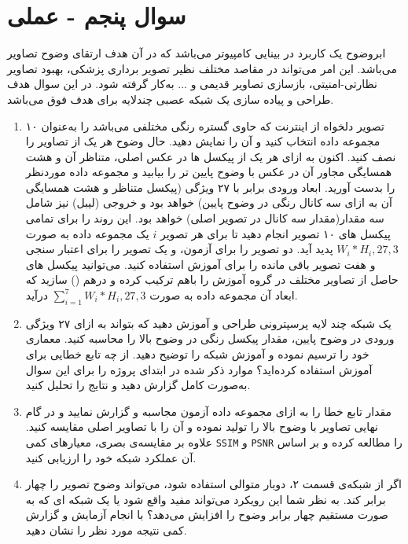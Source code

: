 \section{سوال پنجم - عملی}
ابروضوح یک کاربرد در بینایی کامپیوتر می‌باشد که در آن هدف ارتقای وضوح تصاویر می‌باشد. این امر می‌تواند در مقاصد مختلف نظیر تصویر برداری پزشکی، بهبود تصاویر نظارتی-امنیتی، بازسازی تصاویر قدیمی و ... به‌کار گرفته شود. در این سوال هدف طراحی و پیاده سازی یک شبکه عصبی چند‌لایه برای هدف فوق می‌باشد.



\begin{enumerate}
	\item ۱۰ تصویر دلخواه از اینترنت که حاوی گستره رنگی مختلفی می‌باشد را به‌عنوان مجموعه داده انتخاب کنید و آن را نمایش دهید. حال وضوح هر یک از تصاویر را نصف کنید. اکنون به ازای هر یک از پیکسل ها در عکس اصلی، متناظر آن و هشت همسایگی مجاور آن در عکس با وضوح پایین تر را بیابید و مجموعه داده موردنظر را بدست آورید. ابعاد ورودی برابر با ۲۷ ویژگی (پیکسل متناظر و هشت همسایگی آن به ازای سه کانال رنگی در وضوح پایین) خواهد بود و خروجی (لیبل) نیز شامل سه مقدار(مقدار سه کانال  در تصویر اصلی) خواهد بود. 	این روند را برای تمامی پیکسل های ۱۰ تصویر انجام دهید تا برای هر تصویر $i$ یک مجموعه داده به صورت 
	$W_i*H_i, 27, 3$ پدید آید. دو تصویر را برای آزمون، و یک تصویر را برای اعتبار سنجی و هفت تصویر باقی مانده را برای آموزش استفاده کنید. می‌توانید پیکسل های حاصل از تصاویر مختلف در گروه آموزش را باهم ترکیب کرده و درهم () سازید که ابعاد آن مجموعه داده به صورت $\sum_{i=1}^{7} W_i*H_i, 27, 3$ در‌آید.
	


	
	
	
	
	
	\item یک شبکه چند لایه پرسپترونی طراحی و آموزش دهید که بتواند به ازای ۲۷ ویژگی ورودی در وضوح پایین، مقدار پیکسل رنگی در وضوح بالا را محاسبه کنید. معماری خود را ترسیم نموده و آموزش شبکه را توضیح دهید. از چه تابع خطایی برای آموزش استفاده کرده‌اید؟ موارد ذکر شده در ابتدای پروژه را برای این سوال به‌صورت کامل گزارش دهید و نتایج را تحلیل کنید.
	
	
	
	\item مقدار تابع خطا را به ازای مجموعه داده آزمون مجاسبه و گزارش نمایید و در گام نهایی تصاویر با وضوح بالا را تولید نموده و آن را با تصاویر اصلی مقایسه کنید. علاوه بر مقایسه‌ی بصری، معیار‌های کمی
	\texttt{SSIM} و \texttt{PSNR} را مطالعه کرده و بر اساس آن عملکرد شبکه خود را ارزیابی کنید.

	
	
	
	
	
	\item اگر از شبکه‌ی قسمت ۲، دوبار متوالی استفاده شود، می‌تواند وضوح تصویر را چهار برابر کند. به نظر شما این رویکرد می‌تواند مفید واقع شود یا یک شبکه ای که به صورت مستقیم چهار برابر وضوح را افزایش می‌دهد؟ با انجام آزمایش و گزارش کمی نتیجه مورد نظر را نشان دهید.
	
	

\end{enumerate}










